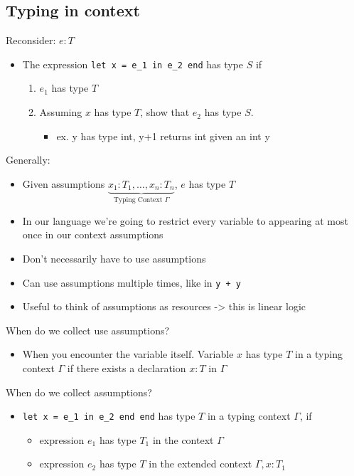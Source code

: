 \documentclass[11pt]{article}
\begin{document}
\subsection{Typing in context}
\label{sec:org843d189}
Reconsider: \(e: T\)
\begin{itemize}
\item The expression \texttt{let x = e\_1 in e\_2 end} has type \(S\) if
\begin{enumerate}
\item \(e_1\) has type \(T\)
\item Assuming \(x\) has type \(T\), show that \(e_2\) has type \(S\).
\begin{itemize}
\item ex. y has type int, y+1 returns int given an int y
\end{itemize}
\end{enumerate}
\end{itemize}
Generally: 
\begin{itemize}
\item Given assumptions \(\underbrace{x_1 : T_1 , \ldots , x_n : T_n}_{\text{Typing Context }\Gamma}\), \(e\) has type \(T\)
\item In our language we're going to restrict every variable to appearing at most once in our context assumptions
\item Don't necessarily have to use assumptions
\item Can use assumptions multiple times, like in \texttt{y + y}
\item Useful to think of assumptions as resources -> this is linear logic
\end{itemize}

When do we collect use assumptions?
\begin{itemize}
\item When you encounter the variable itself. Variable \(x\) has type \(T\) in a typing context \(\Gamma\) if there exists a declaration \(x:T\) in \(\Gamma\)
\end{itemize}
When do we collect assumptions?
\begin{itemize}
\item \texttt{let x = e\_1 in e\_2 end end} has type \(T\) in a typing context \(\Gamma\), if
\begin{itemize}
\item expression \(e_1\) has type \(T_1\) in the context \(\Gamma\)
\item expression \(e_2\) has type \(T\) in the extended context \(\Gamma, x : T_1\)
\end{itemize}
\end{itemize}
\end{document}
